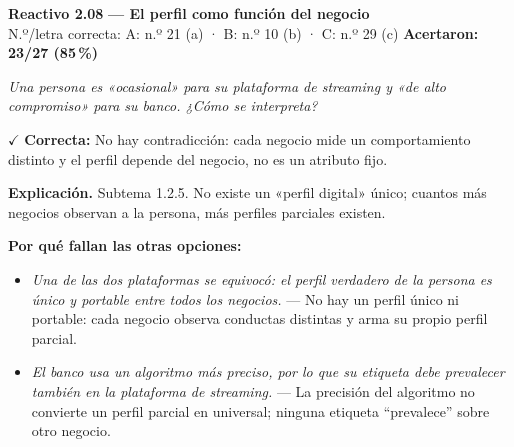 \documentclass[10pt,letterpaper]{article}
\begin{document}
\begin{minipage}{\textwidth}
{\color{guinda}\textbf{Reactivo 2.08}} \textbf{— El perfil como función del negocio}\\[-1pt]
{\scriptsize N.º/letra correcta: A: n.º 21 (a) · B: n.º 10 (b) · C: n.º 29 (c) \hfill \textbf{Acertaron: 23/27 (85\,\%)}}

\textit{Una persona es «ocasional» para su plataforma de streaming y «de alto compromiso» para su banco. ¿Cómo se interpreta?}

\textcolor{verde}{$\checkmark$} \textbf{Correcta:} No hay contradicción: cada negocio mide un comportamiento distinto y el perfil depende del negocio, no es un atributo fijo.

\textbf{Explicación.} Subtema 1.2.5. No existe un «perfil digital» único; cuantos más negocios observan a la persona, más perfiles parciales existen.

\textbf{Por qué fallan las otras opciones:}
\begin{itemize}[itemsep=0pt,topsep=1pt,leftmargin=1.3em,parsep=0pt]
\item[\textcolor{rojo}{$\times$}] \textit{Una de las dos plataformas se equivocó: el perfil verdadero de la persona es único y portable entre todos los negocios.} --- No hay un perfil único ni portable: cada negocio observa conductas distintas y arma su propio perfil parcial.
\item[\textcolor{rojo}{$\times$}] \textit{El banco usa un algoritmo más preciso, por lo que su etiqueta debe prevalecer también en la plataforma de streaming.} --- La precisión del algoritmo no convierte un perfil parcial en universal; ninguna etiqueta ``prevalece'' sobre otro negocio.
\end{itemize}
\end{minipage}\par\vspace{5pt}{\color{gray!40}\hrule}\vspace{5pt}
\end{document}
